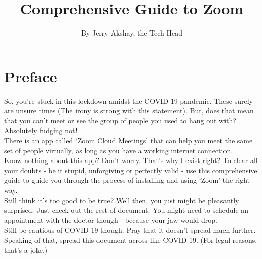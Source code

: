 \documentclass[14pt]{report}
\title{Comprehensive Guide to Zoom}
\author{By Jerry Akshay, the Tech Head}
\renewcommand{\footrulewidth}{0.4pt}
\begin{document}


 	\maketitle

	\newpage


	\chapter*{Preface}\label{chapter}
		

        So, you're stuck in this lockdown amidst the COVID-19 pandemic. These surely are unsure times (The irony is strong with this statement). But, does that mean that you can't meet or see the group of people you used to hang out with? Absolutely fudging not!\\
        
        There is an app called `Zoom Cloud Meetings' that can help you meet the same set of people virtually, as long as you have a working internet connection.\\

        Know nothing about this app? Don't worry. That's why I exist right? To clear all your doubts - be it stupid, unforgiving or perfectly valid - use this comprehensive guide to guide you through the process of installing and using `Zoom' the right way.\\

        Still think it's too good to be true? Well then, you just might be pleasantly surprised. Just check out the rest of document. You might need to schedule an appointment with the doctor though - because your jaw would drop.\\

        Still be cautious of COVID-19 though. Pray that it doesn't spread much further. Speaking of that, spread this document across like COVID-19. (For legal reasons, that's a joke.)

    \newpage


	\renewcommand{\footrulewidth}{0pt}

	\tableofcontents

    \newpage
    
    \listoffigures
\end{document}
